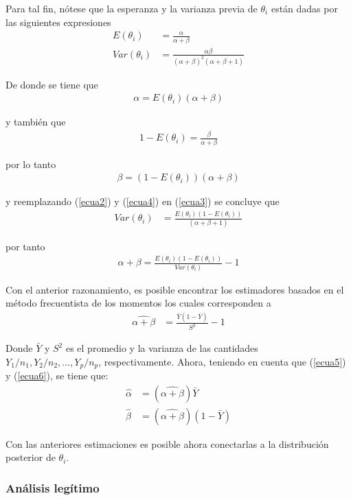 Para tal fin, nótese que la esperanza y la varianza previa de $\theta_i$ están dadas por las siguientes expresiones
\begin{align}
E(\theta_i)&=\frac{\alpha}{\alpha+\beta}\label{ecua2}\\
Var(\theta_i)&=\frac{\alpha\beta}{(\alpha+\beta)^2(\alpha+\beta+1)}\label{ecua3}
\end{align}

De donde se tiene que
\begin{align}\label{ecua5}
\alpha=E(\theta_i)(\alpha+\beta)
\end{align}

y también que
\begin{align}\label{ecua4}
1-E(\theta_i)=\frac{\beta}{\alpha+\beta}
\end{align}

por lo tanto
\begin{align}\label{ecua6}
\beta=(1-E(\theta_i))(\alpha+\beta)
\end{align}

y reemplazando (\ref{ecua2}) y (\ref{ecua4}) en (\ref{ecua3}) se concluye que
\begin{align*}
Var(\theta_i)&=\frac{E(\theta_i)(1-E(\theta_i))}{(\alpha+\beta+1)}
\end{align*}

por tanto
\begin{align}
\alpha+\beta=\frac{E(\theta_i)(1-E(\theta_i))}{Var(\theta_i)}-1
\end{align}

Con el anterior razonamiento, es posible encontrar los estimadores basados en el método frecuentista de los momentos los cuales corresponden a
\begin{align}
\widehat{\alpha+\beta}&=\frac{\bar{Y}(1-\bar{Y})}{S^2}-1
\end{align}

Donde $\bar{Y}$ y $S^2$ es el promedio y la varianza de las cantidades $Y_1/n_1, Y_2/n_2,\ldots, Y_p/n_p$, respectivamente. Ahora, teniendo en cuenta que (\ref{ecua5}) y (\ref{ecua6}), se tiene que:
\begin{align}
\hat{\alpha}&=(\widehat{\alpha+\beta})\bar{Y}\\
\hat{\beta}&=(\widehat{\alpha+\beta})(1-\bar{Y})
\end{align}

 Con las anteriores estimaciones es posible ahora conectarlas a la distribución posterior de $\theta_i$.

\subsubsection{Análisis legítimo}

